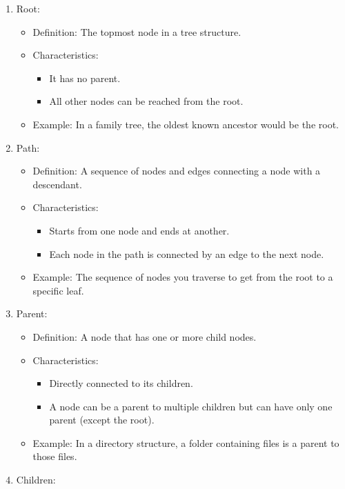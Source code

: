 \begin{enumerate}
\def\labelenumi{\arabic{enumi}.}
\tightlist
\item
  Root:

  \begin{itemize}
  \tightlist
  \item
    Definition: The topmost node in a tree structure.
  \item
    Characteristics:

    \begin{itemize}
    \tightlist
    \item
      It has no parent.
    \item
      All other nodes can be reached from the root.
    \end{itemize}
  \item
    Example: In a family tree, the oldest known ancestor would be the
    root.
  \end{itemize}
\item
  Path:

  \begin{itemize}
  \tightlist
  \item
    Definition: A sequence of nodes and edges connecting a node with a
    descendant.
  \item
    Characteristics:

    \begin{itemize}
    \tightlist
    \item
      Starts from one node and ends at another.
    \item
      Each node in the path is connected by an edge to the next node.
    \end{itemize}
  \item
    Example: The sequence of nodes you traverse to get from the root to
    a specific leaf.
  \end{itemize}
\item
  Parent:

  \begin{itemize}
  \tightlist
  \item
    Definition: A node that has one or more child nodes.
  \item
    Characteristics:

    \begin{itemize}
    \tightlist
    \item
      Directly connected to its children.
    \item
      A node can be a parent to multiple children but can have only one
      parent (except the root).
    \end{itemize}
  \item
    Example: In a directory structure, a folder containing files is a
    parent to those files.
  \end{itemize}
\item
  Children:


\end{enumerate}
